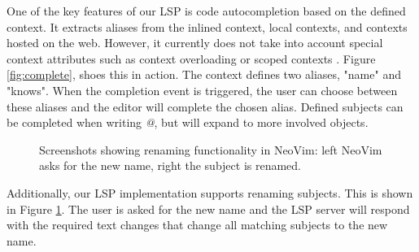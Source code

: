 \documentclass[
]{ceurart}
\begin{document}
One of the key features of our LSP is code autocompletion based on the defined context. It extracts aliases from the inlined context, local contexts, and contexts hosted on the web. However, it currently does not take into account special context attributes such as context overloading or scoped contexts \cite{JSON-LD-W3C}. Figure \ref{fig:complete}, shoes this in action. The context defines two aliases, "name" and "knows". When the completion event is triggered, the user can choose between these aliases and the editor will complete the chosen alias. Defined subjects can be completed when writing \textit{@}, but will expand to more involved objects.

\begin{figure}
\centering
{}
\caption{Screenshots showing renaming functionality in NeoVim: left NeoVim asks for the new name, right the subject is renamed.}
\label{fig:rename}
\end{figure}

Additionally, our LSP implementation supports renaming subjects. This is shown in Figure \ref{fig:rename}. The user is asked for the new name and the LSP server will respond with the required text changes that change all matching subjects to the new name.
\end{document}
